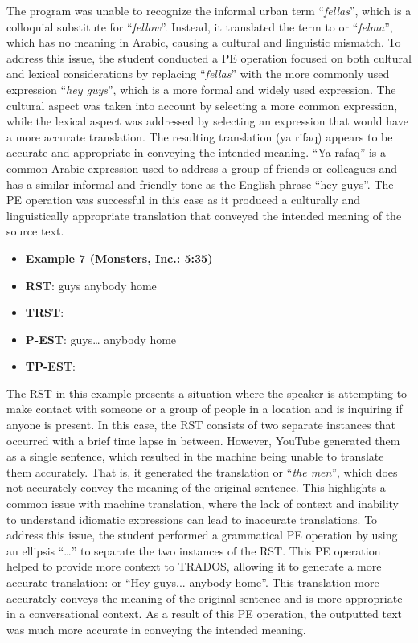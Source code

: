 \documentclass[english]{textolivre}
\begin{document}
The program was unable to recognize the informal urban term “\emph{fellas}”, which is a colloquial substitute for “\emph{fellow}”. Instead, it translated the term to  or “\emph{felma}”, which has no meaning in Arabic, causing a cultural and linguistic mismatch. To address this issue, the student conducted a PE operation focused on both cultural and lexical considerations by replacing “\emph{fellas}” with the more commonly used expression “\emph{hey guys}”, which is a more formal and widely used expression. The cultural aspect was taken into account by selecting a more common expression, while the lexical aspect was addressed by selecting an expression that would have a more accurate translation. The resulting translation  (ya rifaq) appears to be accurate and appropriate in conveying the intended meaning. “Ya rafaq” is a common Arabic expression used to address a group of friends or colleagues and has a similar informal and friendly tone as the English phrase “hey guys”. The PE operation was successful in this case as it produced a culturally and linguistically appropriate translation that conveyed the intended meaning of the source text.

\begin{itemize}
\item \textbf{Example 7 (Monsters, Inc.: 5:35)}
\item \textbf{RST}: guys anybody home
\item \textbf{TRST}: 
\item \textbf{P-EST}: guys… anybody home
\item \textbf{TP-EST}: 
\end{itemize}

The RST in this example presents a situation where the speaker is attempting to make contact with someone or a group of people in a location and is inquiring if anyone is present. In this case, the RST consists of two separate instances that occurred with a brief time lapse in between. However, YouTube generated them as a single sentence, which resulted in the machine being unable to translate them accurately. That is, it generated the translation  or “\emph{the men}”, which does not accurately convey the meaning of the original sentence. This highlights a common issue with machine translation, where the lack of context and inability to understand idiomatic expressions can lead to inaccurate translations. To address this issue, the student performed a grammatical PE operation by using an ellipsis “…” to separate the two instances of the RST. This PE operation helped to provide more context to TRADOS, allowing it to generate a more accurate translation:  or “Hey guys... anybody home”. This translation more accurately conveys the meaning of the original sentence and is more appropriate in a conversational context. As a result of this PE operation, the outputted text was much more accurate in conveying the intended meaning.
\end{document}
